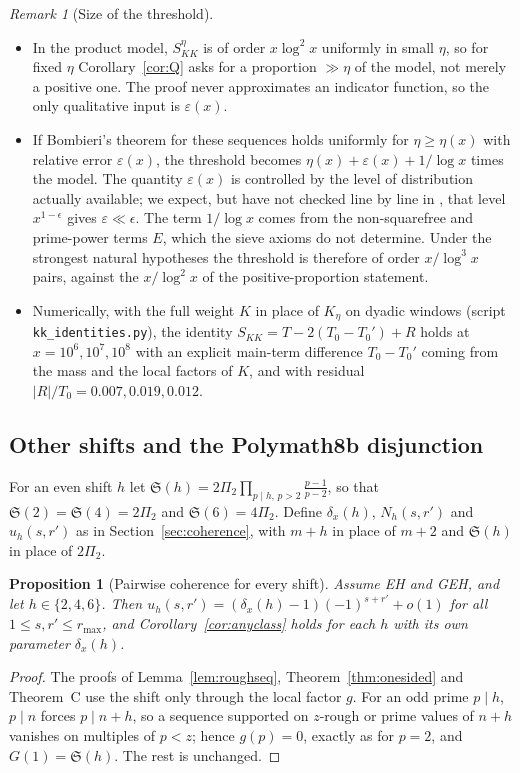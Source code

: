 \documentclass[11pt]{amsart}
\newtheorem{proposition}[theorem]{Proposition}
\theoremstyle{definition}
\theoremstyle{remark}
\newtheorem{remark}[theorem]{Remark}
\begin{document}
\begin{remark}[Size of the threshold]\label{rem:Qthreshold}
\leavevmode
\begin{itemize}
\item In the product model, $S^\eta_{KK}$ is of order $x\log^2x$ uniformly in small $\eta$, so for fixed $\eta$ Corollary~\ref{cor:Q} asks for a proportion $\gg\eta$ of the model, not merely a positive one. The proof never approximates an indicator function, so the only qualitative input is $\varepsilon(x)$.
\item If Bombieri's theorem for these sequences holds uniformly for $\eta\ge\eta(x)$ with relative error $\varepsilon(x)$, the threshold becomes $\eta(x)+\varepsilon(x)+1/\log x$ times the model. The quantity $\varepsilon(x)$ is controlled by the level of distribution actually available; we expect, but have not checked line by line in \cite{Bom76,FI78}, that level $x^{1-\epsilon}$ gives $\varepsilon\ll\epsilon$. The term $1/\log x$ comes from the non-squarefree and prime-power terms $E$, which the sieve axioms do not determine. Under the strongest natural hypotheses the threshold is therefore of order $x/\log^3x$ pairs, against the $x/\log^2x$ of the positive-proportion statement.
\item Numerically, with the full weight $K$ in place of $K_\eta$ on dyadic windows (script \texttt{kk\_identities.py}), the identity $S_{KK}=T-2(T_0-T_0')+R$ holds at $x=10^6,10^7,10^8$ with an explicit main-term difference $T_0-T_0'$ coming from the mass and the local factors of $K$, and with residual $|R|/T_0=0.007,0.019,0.012$.
\end{itemize}
\end{remark}

\subsection{Other shifts and the Polymath8b disjunction}\label{sec:shifts}
For an even shift $h$ let $\mathfrak S(h)=2\Pi_2\prod_{p\mid h,\,p>2}\frac{p-1}{p-2}$, so that $\mathfrak S(2)=\mathfrak S(4)=2\Pi_2$ and $\mathfrak S(6)=4\Pi_2$. Define $\delta_x(h)$, $N_h(s,r')$ and $u_h(s,r')$ as in Section~\ref{sec:coherence}, with $m+h$ in place of $m+2$ and $\mathfrak S(h)$ in place of $2\Pi_2$.

\begin{proposition}[Pairwise coherence for every shift]\label{prop:shifts}
Assume EH and GEH, and let $h\in\{2,4,6\}$. Then $u_h(s,r')=(\delta_x(h)-1)(-1)^{s+r'}+o(1)$ for all $1\le s,r'\le r_{\max}$, and Corollary~\ref{cor:anyclass} holds for each $h$ with its own parameter $\delta_x(h)$.
\end{proposition}
\begin{proof}
The proofs of Lemma~\ref{lem:roughseq}, Theorem~\ref{thm:onesided} and Theorem~C use the shift only through the local factor $g$. For an odd prime $p\mid h$, $p\mid n$ forces $p\mid n+h$, so a sequence supported on $z$-rough or prime values of $n+h$ vanishes on multiples of $p<z$; hence $g(p)=0$, exactly as for $p=2$, and $G(1)=\mathfrak S(h)$. The rest is unchanged.
\end{proof}
\end{document}
